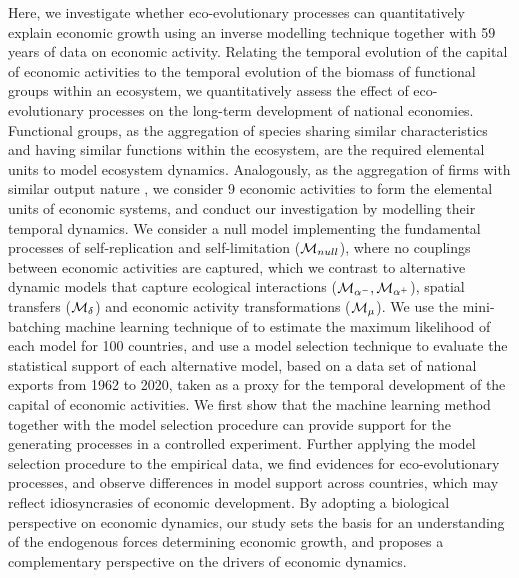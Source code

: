   Here, we investigate whether eco-evolutionary processes can quantitatively explain economic growth using an inverse modelling technique together with 59 years of data on economic activity. Relating the temporal evolution of the capital of economic activities to the temporal evolution of the biomass of functional groups within an ecosystem, we quantitatively assess the effect of eco-evolutionary processes on the long-term development of national economies.
  Functional groups, as the aggregation of species sharing similar characteristics and having similar functions within the ecosystem, are the required elemental units to model ecosystem dynamics. Analogously, as the aggregation of firms with similar output nature \citep{Applegate2021}, we consider 9 economic activities to form the elemental units of economic systems, and  conduct our investigation by modelling their temporal dynamics.
  We consider a null model implementing the fundamental processes of self-replication and self-limitation ($\mathcal{M}_{null}$), where no couplings between economic activities are captured, which we contrast to alternative  dynamic models that capture ecological interactions ($\mathcal{M}_{\alpha^-},\mathcal{M}_{\alpha^+}$), spatial transfers ($\mathcal{M}_\delta$) and economic activity transformations ($\mathcal{M}_\mu$).
  We use the mini-batching machine learning technique of \citep{Boussange2022a} to estimate the maximum likelihood of each model for 100 countries, and use a model selection technique to evaluate the statistical support of each alternative model, based on a data set of national exports from 1962 to 2020, taken as a proxy for the temporal development of the capital of economic activities. 
  We first show that the machine learning method together with the model selection procedure can provide support for the generating processes in a controlled experiment.
  Further applying the model selection procedure to the empirical data, we find evidences for eco-evolutionary processes, and observe differences in model support across countries, which may reflect idiosyncrasies of economic development. 
  By adopting a biological perspective on economic dynamics, our study sets the basis for an understanding of the endogenous forces determining economic growth, and proposes a complementary perspective on the drivers of economic dynamics.
\begin{comment}
    As in previous work \citep{Michalakelis2011}, 
    \citep{Brummitt2020}: analysis of time series to understand patterns of growth. For sure to be cited. Our work goes in this direction, and further provides other distinction, i.e. evolution is a distinguishable factor.
\end{comment}

